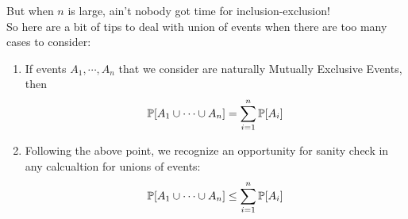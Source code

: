 But when $n$ is large, ain't nobody got time for inclusion-exclusion! \\
So here are a bit of tips to deal with union of events when there are too many cases to consider:
\begin{enumerate}
    \item If events $A_1, \cdots, A_n$ that we consider are naturally Mutually Exclusive Events, then \[\P[A_1 \cup \cdots \cup A_n] = \sum_{i = 1}^n \P[A_i]\]
    \item Following the above point, we recognize an opportunity for sanity check in any calcualtion for unions of events:  \[\P[A_1 \cup \cdots \cup A_n] \leq \sum_{i = 1}^n \P[A_i]\]
\end{enumerate}
